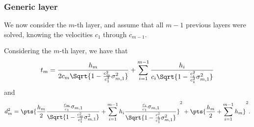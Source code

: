 %
%

\subsubsection{Generic layer}

We now consider the $m$-th layer, and assume that all $m-1$ previous layers were solved, knowing the velocities $c_1$ through $c_{m-1}$.

Considering the $m$-th layer, we have that
\begin{equation}
	t_m = \frac{h_m}{2c_m\Sqrt{1-\frac{c_m^2}{c_1^2}\sigma_{m,1}^2}} + \sum_{i=1}^{m-1} \frac{h_i}{c_i\Sqrt{1-\frac{c_i^2}{c_1^2}\sigma_{m,1}^2}}
	\label{eq:sec3:ttt:travel-time_mth-layer}
\end{equation}
and
\begin{equation}
	d_m^2 = \pts{\frac{h_m}{2} \frac{\frac{c_m}{c_1}\sigma_{m,1}}{\Sqrt{1-\frac{c_m^2}{c_1^2}\sigma_{m,1}^2 }} + \sum_{i=1}^{m-1} h_i \frac{\frac{c_i}{c_1}\sigma_{m,1}}{\Sqrt{1-\frac{c_i^2}{c_1^2}\sigma_{m,1}^2 }} }^2 + \pts{\frac{h_m}{2} + \sum_{i=1}^{m-1} h_m}^2.
	\label{eq:sec3:ttt:distance_mth-layer}
\end{equation}

